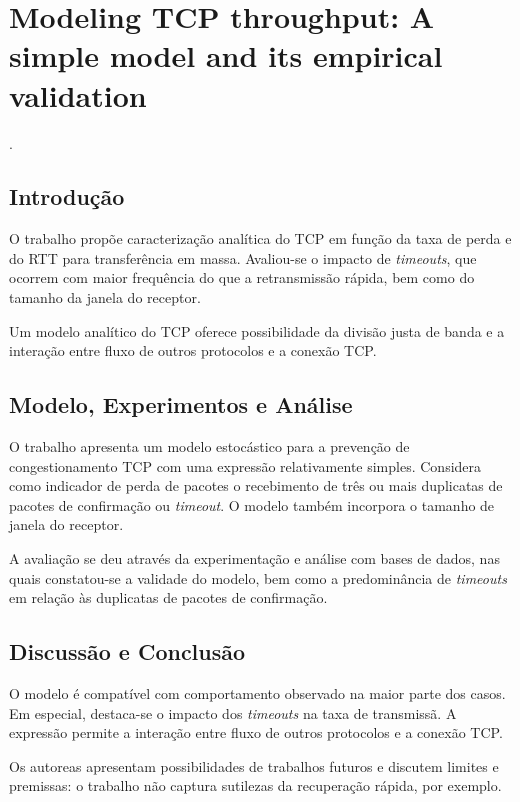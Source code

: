 
\chapter{Modeling TCP throughput: A simple model and its empirical validation}
 \cite{padhye1998modeling}.


\section*{Introdução}

O trabalho propõe caracterização analítica do TCP em função da taxa de perda e 
do RTT para transferência em massa. Avaliou-se o impacto de \textit{timeouts}, 
que ocorrem com maior frequência do que a retransmissão rápida, bem como do 
tamanho da janela do receptor.

Um modelo analítico do TCP oferece possibilidade da divisão justa de banda e a 
interação entre fluxo de outros protocolos e a conexão TCP.


\section*{Modelo, Experimentos e Análise}

O trabalho apresenta um modelo estocástico para a prevenção de congestionamento 
TCP com uma expressão relativamente simples. Considera como indicador de perda 
de pacotes o recebimento de três ou mais duplicatas de pacotes de confirmação 
ou \textit{timeout}. O modelo também incorpora o tamanho de janela do receptor.

A avaliação se deu através da experimentação e análise com bases de dados, nas 
quais constatou-se a validade do modelo, bem como a predominância de 
\textit{timeouts} em relação às duplicatas de pacotes de confirmação.


\section*{Discussão e Conclusão}

O modelo é compatível com comportamento observado na maior parte dos casos. Em 
especial, destaca-se o impacto dos \textit{timeouts} na taxa de transmissã. A 
expressão permite a interação entre fluxo de outros protocolos e a conexão TCP.

Os autoreas apresentam possibilidades de trabalhos futuros e discutem limites e 
premissas: o trabalho não captura sutilezas da recuperação rápida, por exemplo.
